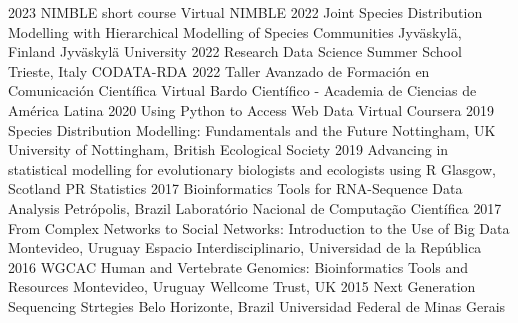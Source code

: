 \documentclass[9pt]{developercv} %
\begin{document}

\begin{entrylist}
	\entrylong
		{2023}
		{NIMBLE short course}
		{Virtual}
		{NIMBLE}
	\entrylong
		{2022}
		{Joint Species Distribution Modelling with Hierarchical Modelling of Species Communities}
		{Jyväskylä, Finland}
		{Jyväskylä University}	
	\entrylong
		{2022}
		{Research Data Science Summer School}
		{Trieste, Italy}
		{CODATA-RDA}	
	\entrylong
		{2022}
		{Taller Avanzado de Formación en Comunicación Científica}
		{Virtual}
		{Bardo Científico - Academia de Ciencias de América Latina}	
	\entrylong
		{2020}
		{Using Python to Access Web Data}
		{Virtual}
		{Coursera}	
	\entrylong
		{2019}
		{Species Distribution Modelling: Fundamentals and the Future}
		{Nottingham, UK}
		{University of Nottingham, British Ecological Society}	
	\entrylong
		{2019}
		{Advancing in statistical modelling for evolutionary biologists and ecologists using R}
		{Glasgow, Scotland}
		{PR Statistics}	
	\entrylong
		{2017}
		{Bioinformatics Tools for RNA-Sequence Data Analysis}
		{Petrópolis, Brazil}
		{Laboratório Nacional de Computação Científica}
	\entrylong
		{2017}
		{From Complex Networks to Social Networks: Introduction to the Use of Big Data}
		{Montevideo, Uruguay}
		{Espacio Interdisciplinario, Universidad de la República}
	\entrylong
		{2016}
		{WGCAC Human and Vertebrate Genomics: Bioinformatics Tools and Resources}
		{Montevideo, Uruguay}
		{Wellcome Trust, UK}
	\entrylong
		{2015}
		{Next Generation Sequencing Strtegies}
		{Belo Horizonte, Brazil}
		{Universidad Federal de Minas Gerais}

\end{entrylist}


\end{document}
